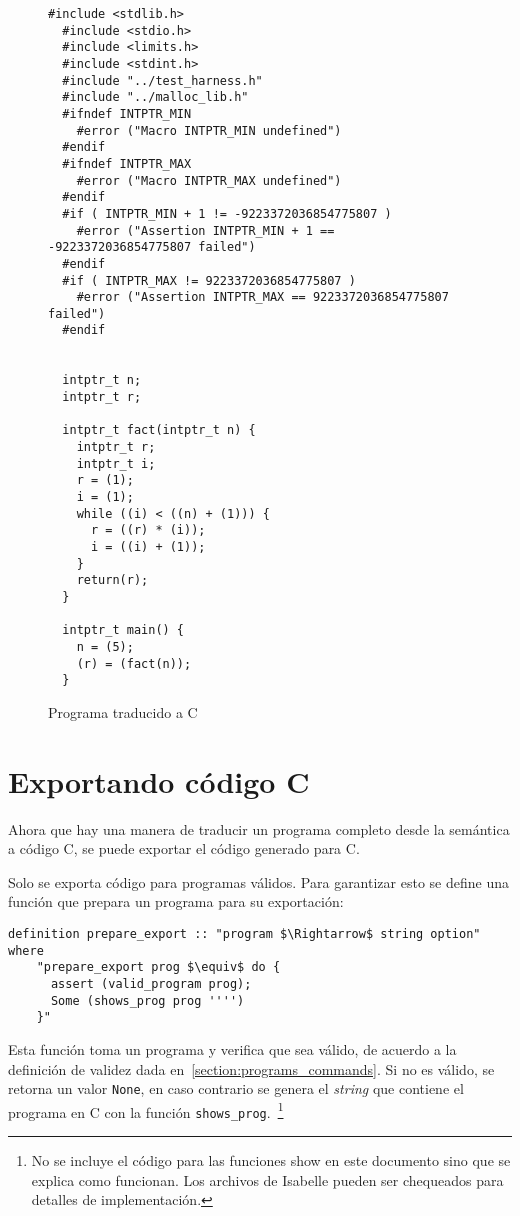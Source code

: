 \begin{figure}
\begin{lstlisting}[mathescape=true]
  #include <stdlib.h>
  #include <stdio.h>
  #include <limits.h>
  #include <stdint.h>
  #include "../test_harness.h"
  #include "../malloc_lib.h"
  #ifndef INTPTR_MIN
    #error ("Macro INTPTR_MIN undefined")
  #endif
  #ifndef INTPTR_MAX
    #error ("Macro INTPTR_MAX undefined")
  #endif
  #if ( INTPTR_MIN + 1 != -9223372036854775807 )
    #error ("Assertion INTPTR_MIN + 1 == -9223372036854775807 failed")
  #endif
  #if ( INTPTR_MAX != 9223372036854775807 )
    #error ("Assertion INTPTR_MAX == 9223372036854775807 failed")
  #endif


  intptr_t n;
  intptr_t r;

  intptr_t fact(intptr_t n) {
    intptr_t r;
    intptr_t i;
    r = (1);
    i = (1);
    while ((i) < ((n) + (1))) {
      r = ((r) * (i));
      i = ((i) + (1));
    }
    return(r);
  }

  intptr_t main() {
    n = (5);
    (r) = (fact(n));
  }
\end{lstlisting}
\caption{Programa traducido a C}
\label{fig:factorial_c}
\end{figure}

\section{Exportando código C}\label{section:exporting_c_code}

Ahora que hay una manera de traducir un programa completo desde la semántica a código C, se puede exportar el código generado para C.

Solo se exporta código para programas válidos.
Para garantizar esto se define una función que prepara un programa para su exportación:

\begin{lstlisting}[mathescape=true]
  definition prepare_export :: "program $\Rightarrow$ string option" where
    "prepare_export prog $\equiv$ do {
      assert (valid_program prog);
      Some (shows_prog prog '''')
    }"
\end{lstlisting}


Esta función toma un programa y verifica que sea válido, de acuerdo a la definición de validez dada en~\ref{section:programs_commands}.
Si no es válido, se retorna un valor \verb|None|, en caso contrario se genera el \textit{string} que contiene el programa en C con la función \verb|shows_prog|.~\footnote{No se incluye el código para las funciones show en este documento sino que se explica como funcionan. Los archivos de Isabelle pueden ser chequeados para detalles de implementación.}

